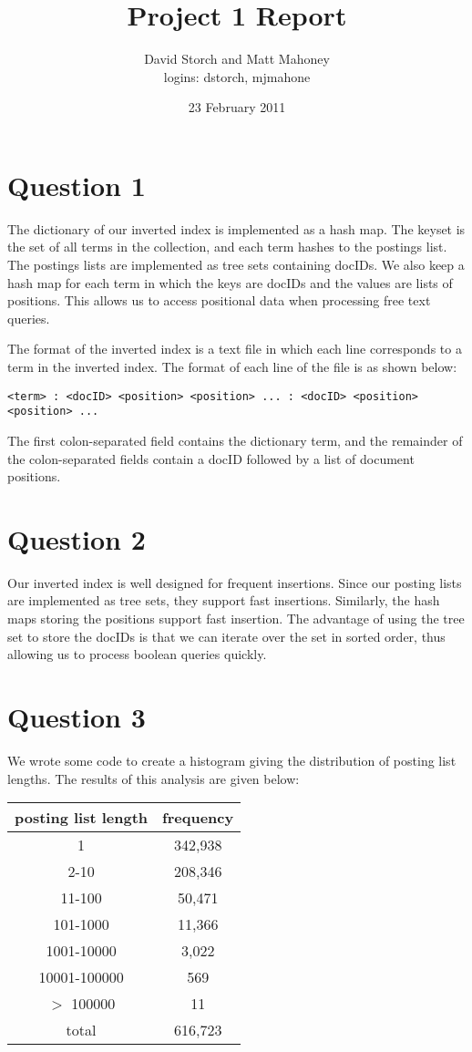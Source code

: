 \documentclass[11pt]{article}
\title{Project 1 Report}
\author{David Storch and Matt Mahoney \\
	logins: dstorch, mjmahone}
\date{23 February 2011}
\begin{document}
\maketitle

\section{Question 1}

The dictionary of our inverted index is implemented as a hash map. The keyset is the set of all terms in the collection, and
each term hashes to the postings list. The postings lists are implemented as tree sets containing docIDs. We also keep a hash map
for each term in which the keys are docIDs and the values are lists of positions. This allows us to access positional data
when processing free text queries.

The format of the inverted index is a text file in which each line corresponds to a term in the inverted index.
The format of each line of the file is as shown below:
\begin{verbatim}
<term> : <docID> <position> <position> ... : <docID> <position> <position> ...
\end{verbatim}
The first colon-separated field contains the dictionary term, and
the remainder of the colon-separated fields contain a docID followed by a list of document positions.

\section{Question 2}

Our inverted index is well designed for frequent insertions. Since our posting lists are implemented
as tree sets, they support fast insertions. Similarly, the hash maps storing the positions support
fast insertion. The advantage of using the tree set to store the docIDs is that we can iterate over
the set in sorted order, thus allowing us to process boolean queries quickly.

\section{Question 3}

We wrote some code to create a histogram giving the distribution of posting list lengths.
The results of this analysis are given below:

\centering
\begin{tabular}{|c|c|}
\hline
\textbf{posting list length} & \textbf{frequency} \\
\hline
1 & 342,938 \\
2-10 & 208,346 \\
11-100 & 50,471 \\
101-1000 & 11,366 \\
1001-10000 & 3,022 \\
10001-100000 & 569 \\
$>$ 100000 & 11 \\
\hline
total & 616,723 \\
\hline
\end{tabular}
\end{document}
